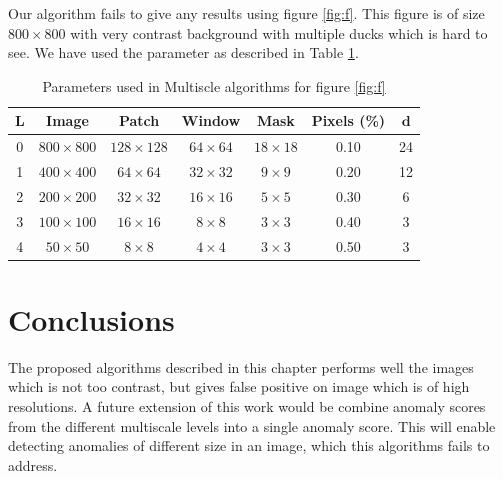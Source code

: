 Our algorithm fails to give any results using figure \ref{fig:f}. This figure is of size $800\times800$ with very contrast background with multiple ducks which is hard to see. We have used the parameter as described in Table \ref{T: PD}.

\begin{table}
\caption{Parameters used in Multiscle algorithms for figure \ref{fig:f}}
\begin{center}
 \begin{tabular}{c c c c c c c} 
  \hline\hline 
 $\mathbf{L}$ & Image & Patch & Window & Mask & Pixels (\%) & $\mathbf{d}$\\ [0.5ex]   
 \hline
 0 & $800\times800$ & $128\times128$ & $64\times64$ & $18\times18$ & 0.10 & 24 \\ 

 1 & $400\times400$ & $64\times64$ & $32\times32$ & $9\times9$ & 0.20 & 12 \\

 2 & $200\times200$ & $32\times32$ & $16\times16$ & $5\times5$ & 0.30 & 6 \\ 
 
 3 & $100\times100$ & $16\times16$ & $8\times8$ & $3\times3$ & 0.40 & 3 \\
 
 4 & $50\times50$ & $8\times8$ & $4\times4$ & $3\times3$ & 0.50 & 3 \\ [1ex] 
\hline
\end{tabular}
\end{center}
\label{T: PD}
\end{table}

\section{Conclusions}
The proposed algorithms described in this chapter performs well the images which is not too contrast, but gives false positive on image which is of high resolutions. A future extension of this work would be combine  anomaly
scores from the different multiscale levels into a single anomaly score. This will enable detecting anomalies of different size in an image, which this algorithms fails to address.
